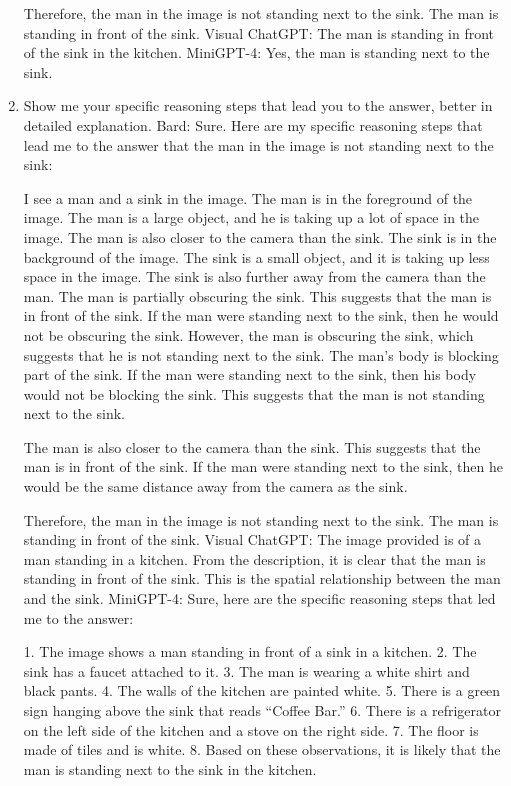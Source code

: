 \begin{enumerate}
    Therefore, the man in the image is not standing next to the sink. The man is standing in front of the sink.
    \subitem Visual ChatGPT: The man is standing in front of the sink in the kitchen.
    \subitem MiniGPT-4: Yes, the man is standing next to the sink.
    \item Show me your specific reasoning steps that lead you to the answer, better in detailed explanation.
    \subitem Bard: 
    Sure. Here are my specific reasoning steps that lead me to the answer that the man in the image is not standing next to the sink:
    
    I see a man and a sink in the image.
    The man is in the foreground of the image. The man is a large object, and he is taking up a lot of space in the image. The man is also closer to the camera than the sink.
    The sink is in the background of the image. The sink is a small object, and it is taking up less space in the image. The sink is also further away from the camera than the man.
    The man is partially obscuring the sink. This suggests that the man is in front of the sink.
    If the man were standing next to the sink, then he would not be obscuring the sink. However, the man is obscuring the sink, which suggests that he is not standing next to the sink.
    The man's body is blocking part of the sink. If the man were standing next to the sink, then his body would not be blocking the sink. This suggests that the man is not standing next to the sink.
    
    The man is also closer to the camera than the sink. This suggests that the man is in front of the sink. If the man were standing next to the sink, then he would be the same distance away from the camera as the sink.
    
    Therefore, the man in the image is not standing next to the sink. The man is standing in front of the sink.
    \subitem Visual ChatGPT: The image provided is of a man standing in a kitchen. From the description, it is clear that the man is standing in front of the sink. This is the spatial relationship between the man and the sink.
    \subitem MiniGPT-4: Sure, here are the specific reasoning steps that led me to the answer:

    1. The image shows a man standing in front of a sink in a kitchen.
    2. The sink has a faucet attached to it.
    3. The man is wearing a white shirt and black pants.
    4. The walls of the kitchen are painted white.
    5. There is a green sign hanging above the sink that reads “Coffee Bar.”
    6. There is a refrigerator on the left side of the kitchen and a stove on the right side.
    7. The floor is made of tiles and is white.
    8. Based on these observations, it is likely that the man is standing next to the sink in the kitchen.
\end{enumerate}
